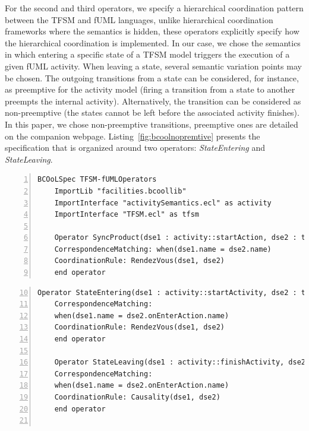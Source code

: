	For the second and third operators, we specify a hierarchical coordination pattern between the TFSM and fUML languages, unlike hierarchical coordination frameworks where the semantics is hidden, these operators explicitly specify how the hierarchical coordination is implemented. In our case, we chose the semantics in which entering a specific state of a TFSM model triggers the execution of a given fUML activity. When leaving a state, several semantic variation points may be chosen. The outgoing transitions from a state can be considered, for instance, as preemptive for the activity model (\ie firing a transition from a state to another preempts the internal activity). Alternatively, the transition can be considered as non-preemptive (\ie the states cannot be left before the associated activity finishes). In this paper, we chose non-preemptive transitions, preemptive ones are detailed on the companion webpage. Listing~\ref{fig:bcoolnopremtive} presents the \bcool specification that is organized around two operators: \textit{StateEntering} and \textit{StateLeaving}. 
	
	\begin{lstlisting}[language=bcool,
	caption={Heterogeneous synchronized product operator between the TFSM and fUML languages},
	label={fig:bcoolsyncrohetero}, 
	basicstyle=\scriptsize\ttfamily, backgroundcolor=\color{LGrey}, numbers=left, xleftmargin=2pt]
	BCOoLSpec TFSM-fUMLOperators
	ImportLib "facilities.bcoollib"
	ImportInterface "activitySemantics.ecl" as activity
	ImportInterface "TFSM.ecl" as tfsm
	
	Operator SyncProduct(dse1 : activity::startAction, dse2 : tfsm::occurs)
	CorrespondenceMatching: when(dse1.name = dse2.name)
	CoordinationRule: RendezVous(dse1, dse2)
	end operator
	\end{lstlisting}
	
	
	
	\begin{lstlisting}[language=bcool,
	caption={Hierarchical coordination operators between TFSM and fUML languages},
	label={fig:bcoolnopremtive}, 
	basicstyle=\scriptsize\ttfamily, backgroundcolor=\color{LGrey}, numbers=left,firstnumber=10, xleftmargin=2pt]
	Operator StateEntering(dse1 : activity::startActivity, dse2 : tfsm::entering)
	CorrespondenceMatching: 
	when(dse1.name = dse2.onEnterAction.name)
	CoordinationRule: RendezVous(dse1, dse2)
	end operator
	
	Operator StateLeaving(dse1 : activity::finishActivity, dse2 : tfsm::leaving)
	CorrespondenceMatching: 
	when(dse1.name = dse2.onEnterAction.name)
	CoordinationRule: Causality(dse1, dse2)
	end operator
	
	\end{lstlisting}
	
